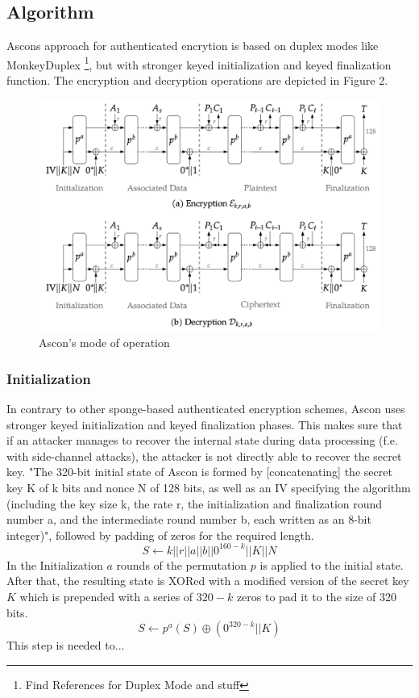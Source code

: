 \subsection{Algorithm} %
Ascons approach for authenticated encrytion is based on duplex modes like MonkeyDuplex \footnote[3]{Find References for Duplex Mode and stuff}, but with stronger keyed initialization and keyed finalization function. The encryption and decryption operations are depicted in Figure 2. \cite{Ascon-v1.2}
\begin{figure}[H]
    \centering
    \includegraphics[width=1\textwidth]{figures/aead-algorithm.png}
    \caption{Ascon's mode of operation \cite{Ascon-v1.2}}
    \label{fig:aead-algorithm}
\end{figure}
\subsubsection{Initialization}
In contrary to other sponge-based authenticated encryption schemes, Ascon uses stronger keyed initialization and keyed finalization phases. This makes sure that if an attacker manages to recover the internal state during data processing (f.e. with side-channel attacks), the attacker is not directly able to recover the secret key.\cite[Chapter 5.1]{Ascon-v1.2}
"The 320-bit initial state of Ascon is formed by [concatenating] the secret key K of k bits and nonce N of 128 bits, as well as an IV specifying the algorithm (including the key size k, the rate r, the initialization and finalization round number a, and the intermediate round number b, each written as an 8-bit integer)", followed by padding of zeros for the required length. %
$$S \leftarrow k || r || a || b || 0^{160-k} || K || N $$
In the Initialization $a$ rounds of the permutation $p$ is applied to the initial state. After that, the resulting state is XORed with a modified version of the secret key $K$ which is prepended with a series of $320-k$ zeros to pad it to the size of 320 bits. \cite{Ascon-v1.2}
$$S \leftarrow p^a(S) \oplus (0^{320-k} || K)$$
This step is needed to... 
